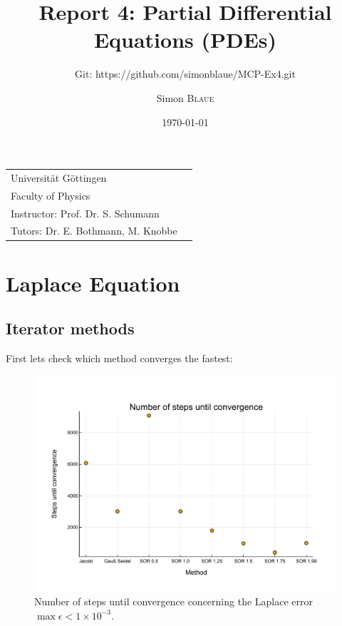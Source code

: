 \documentclass[
	a4paper, %
	10pt, %
]{CSUniSchoolLabReport}
\title{Report 4: Partial Differential Equations (PDEs)} %
\subtitle{Git: https://github.com/simonblaue/MCP-Ex4.git}
\author{Simon \textsc{Blaue}} %
\date{\today} %
\begin{document}
\maketitle %

\vspace*{40px}

\begin{tabular}{l r}
	Universität Göttingen \\ %
	Faculty of Physics \\
	Instructor: Prof. Dr. S. Schumann \\
	Tutors: Dr. E. Bothmann, M. Knobbe \\ %
\end{tabular}



\newpage

\ohead{\pagemark}

\section{Laplace Equation}

\subsection{Iterator methods}

First lets check which method converges the fastest:

\begin{figure}[H]
	\centering
	\includegraphics[width=\textwidth]{../saves_t1/number_of_convergence_steps.pdf}
	\caption{Number of steps until convergence concerning the Laplace error $\max\epsilon<1\times 10^{-3}$.}
\end{figure}
\end{document}
